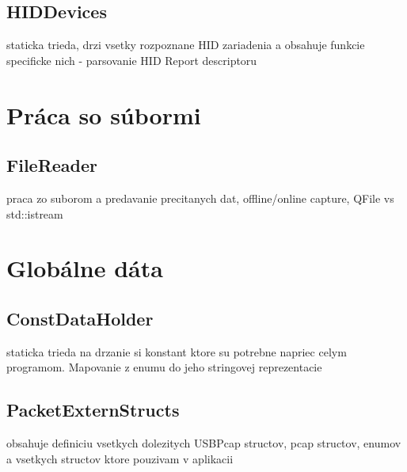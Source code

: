 \subsection{HIDDevices}
staticka trieda, drzi vsetky rozpoznane HID zariadenia a obsahuje funkcie specificke nich - parsovanie HID Report descriptoru
\section{Práca so súbormi}
\subsection{FileReader}
praca zo suborom a predavanie precitanych dat, offline/online capture, QFile vs std::istream
\section{Globálne dáta}
\subsection{ConstDataHolder}
staticka trieda na drzanie si konstant ktore su potrebne napriec celym programom. Mapovanie z enumu do jeho stringovej reprezentacie
\subsection{PacketExternStructs}
obsahuje definiciu vsetkych dolezitych USBPcap structov, pcap structov, enumov a vsetkych structov ktore pouzivam v aplikacii












